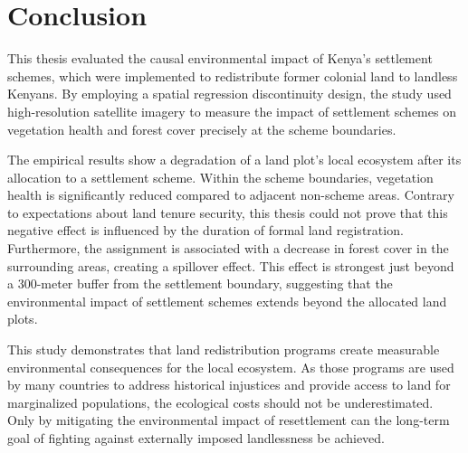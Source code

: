 \section{Conclusion}
\label{sec:conclusion}

This thesis evaluated the causal environmental impact of Kenya's settlement schemes, which were implemented to redistribute former colonial land to landless Kenyans.
By employing a spatial regression discontinuity design, the study used high-resolution satellite imagery to measure the impact of settlement schemes on vegetation health and forest cover precisely at the scheme boundaries.

The empirical results show a degradation of a land plot's local ecosystem after its allocation to a settlement scheme.
Within the scheme boundaries, vegetation health is significantly reduced compared to adjacent non-scheme areas.
Contrary to expectations about land tenure security, this thesis could not prove that this negative effect is influenced by the duration of formal land registration.
Furthermore, the assignment is associated with a decrease in forest cover in the surrounding areas, creating a spillover effect.
This effect is strongest just beyond a 300-meter buffer from the settlement boundary, suggesting that the environmental impact of settlement schemes extends beyond the allocated land plots.

This study demonstrates that land redistribution programs create measurable environmental consequences for the local ecosystem.
As those programs are used by many countries to address historical injustices and provide access to land for marginalized populations, the ecological costs should not be underestimated.
Only by mitigating the environmental impact of resettlement can the long-term goal of fighting against externally imposed landlessness be achieved.